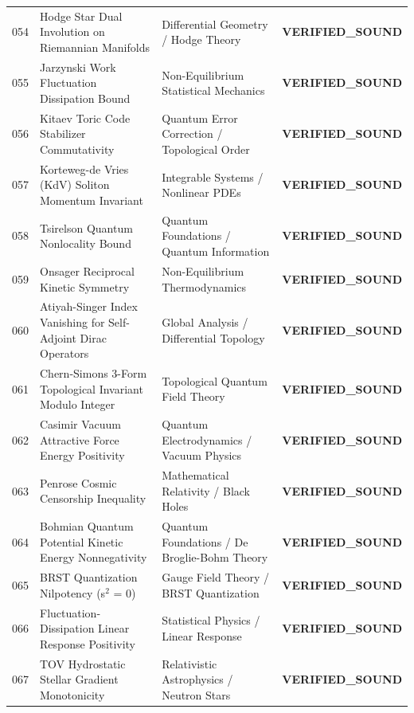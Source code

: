 \documentclass[10pt,a4paper]{article}
\begin{document}
\begin{longtable}{p{0.8cm} p{7.0cm} p{3.8cm} p{3.0cm}}
054 & Hodge Star Dual Involution on Riemannian Manifolds & Differential Geometry / Hodge Theory & \textcolor{green!70!black}{\textbf{VERIFIED\_SOUND}} \\
055 & Jarzynski Work Fluctuation Dissipation Bound & Non-Equilibrium Statistical Mechanics & \textcolor{green!70!black}{\textbf{VERIFIED\_SOUND}} \\
056 & Kitaev Toric Code Stabilizer Commutativity & Quantum Error Correction / Topological Order & \textcolor{green!70!black}{\textbf{VERIFIED\_SOUND}} \\
057 & Korteweg-de Vries (KdV) Soliton Momentum Invariant & Integrable Systems / Nonlinear PDEs & \textcolor{green!70!black}{\textbf{VERIFIED\_SOUND}} \\
058 & Tsirelson Quantum Nonlocality Bound & Quantum Foundations / Quantum Information & \textcolor{green!70!black}{\textbf{VERIFIED\_SOUND}} \\
059 & Onsager Reciprocal Kinetic Symmetry & Non-Equilibrium Thermodynamics & \textcolor{green!70!black}{\textbf{VERIFIED\_SOUND}} \\
060 & Atiyah-Singer Index Vanishing for Self-Adjoint Dirac Operators & Global Analysis / Differential Topology & \textcolor{green!70!black}{\textbf{VERIFIED\_SOUND}} \\
061 & Chern-Simons 3-Form Topological Invariant Modulo Integer & Topological Quantum Field Theory & \textcolor{green!70!black}{\textbf{VERIFIED\_SOUND}} \\
062 & Casimir Vacuum Attractive Force Energy Positivity & Quantum Electrodynamics / Vacuum Physics & \textcolor{green!70!black}{\textbf{VERIFIED\_SOUND}} \\
063 & Penrose Cosmic Censorship Inequality & Mathematical Relativity / Black Holes & \textcolor{green!70!black}{\textbf{VERIFIED\_SOUND}} \\
064 & Bohmian Quantum Potential Kinetic Energy Nonnegativity & Quantum Foundations / De Broglie-Bohm Theory & \textcolor{green!70!black}{\textbf{VERIFIED\_SOUND}} \\
065 & BRST Quantization Nilpotency (s$^2$ = 0) & Gauge Field Theory / BRST Quantization & \textcolor{green!70!black}{\textbf{VERIFIED\_SOUND}} \\
066 & Fluctuation-Dissipation Linear Response Positivity & Statistical Physics / Linear Response & \textcolor{green!70!black}{\textbf{VERIFIED\_SOUND}} \\
067 & TOV Hydrostatic Stellar Gradient Monotonicity & Relativistic Astrophysics / Neutron Stars & \textcolor{green!70!black}{\textbf{VERIFIED\_SOUND}} \\

\end{longtable}
\end{document}
